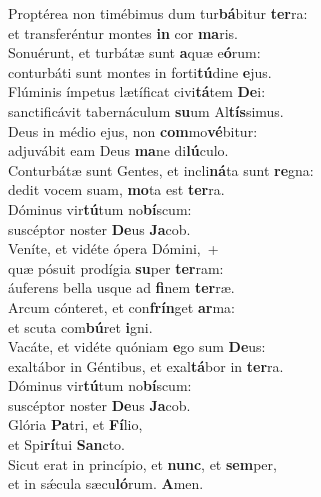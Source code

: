 \evenverse Proptérea non timébimus dum tur\textbf{bá}bitur \textbf{ter}ra:~\*\\
\evenverse et transferéntur montes \textbf{in} cor \textbf{ma}ris.\\
\oddverse Sonuérunt, et turbátæ sunt \textbf{a}quæ e\textbf{ó}rum:~\*\\
\oddverse conturbáti sunt montes in forti\textbf{tú}dine \textbf{e}jus.\\
\evenverse Flúminis ímpetus lætíficat civi\textbf{tá}tem \textbf{De}i:~\*\\
\evenverse sanctificávit tabernáculum \textbf{su}um Al\textbf{tís}simus.\\
\oddverse Deus in médio ejus, non \textbf{com}mo\textbf{vé}bitur:~\*\\
\oddverse adjuvábit eam Deus \textbf{ma}ne di\textbf{lú}culo.\\
\evenverse Conturbátæ sunt Gentes, et incli\textbf{ná}ta sunt \textbf{re}gna:~\*\\
\evenverse dedit vocem suam, \textbf{mo}ta est \textbf{ter}ra.\\
\oddverse Dóminus vir\textbf{tú}tum no\textbf{bí}scum:~\*\\
\oddverse suscéptor noster \textbf{De}us \textbf{Ja}cob.\\
\evenverse Veníte, et vidéte ópera Dómini,~+\\
\evenverse  quæ pósuit prodígia \textbf{su}per \textbf{ter}ram:~\*\\
\evenverse áuferens bella usque ad \textbf{fi}nem \textbf{ter}ræ.\\
\oddverse Arcum cónteret, et con\textbf{frín}get \textbf{ar}ma:~\*\\
\oddverse et scuta com\textbf{bú}ret \textbf{i}gni.\\
\evenverse Vacáte, et vidéte quóniam \textbf{e}go sum \textbf{De}us:~\*\\
\evenverse exaltábor in Géntibus, et exal\textbf{tá}bor in \textbf{ter}ra.\\
\oddverse Dóminus vir\textbf{tú}tum no\textbf{bí}scum:~\*\\
\oddverse suscéptor noster \textbf{De}us \textbf{Ja}cob.\\
\evenverse Glória \textbf{Pa}tri, et \textbf{Fí}lio,~\*\\
\evenverse et Spi\textbf{rí}tui \textbf{San}cto.\\
\oddverse Sicut erat in princípio, et \textbf{nunc}, et \textbf{sem}per,~\*\\
\oddverse et in sǽcula sæcu\textbf{ló}rum. \textbf{A}men.\\
